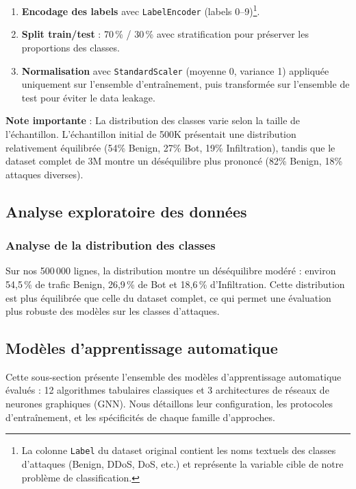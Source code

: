 ﻿\documentclass[11pt,a4paper]{article}
\begin{document}
\begin{enumerate}
    \item \textbf{Encodage des labels} avec \texttt{LabelEncoder} (labels 0--9)\footnote{La colonne \texttt{Label} du dataset original contient les noms textuels des classes d'attaques (Benign, DDoS, DoS, etc.) et représente la variable cible de notre problème de classification.}.
    
    \item \textbf{Split train/test} : 70\,\% / 30\,\% avec stratification pour préserver les proportions des classes.
    
    \item \textbf{Normalisation} avec \texttt{StandardScaler} (moyenne 0, variance 1) appliquée uniquement sur l'ensemble d'entraînement, puis transformée sur l'ensemble de test pour éviter le data leakage.
\end{enumerate}

\textbf{Note importante} : La distribution des classes varie selon la taille de l'échantillon. L'échantillon initial de 500K présentait une distribution relativement équilibrée (54\% Benign, 27\% Bot, 19\% Infiltration), tandis que le dataset complet de 3M montre un déséquilibre plus prononcé (82\% Benign, 18\% attaques diverses).

\subsection{Analyse exploratoire des données}

\subsubsection{Analyse de la distribution des classes}

Sur nos 500\,000 lignes, la distribution montre un déséquilibre modéré : environ 54,5\,\% de trafic Benign, 26,9\,\% de Bot et 18,6\,\% d'Infiltration. Cette distribution est plus équilibrée que celle du dataset complet, ce qui permet une évaluation plus robuste des modèles sur les classes d'attaques.

\subsection{Modèles d'apprentissage automatique}

Cette sous-section présente l'ensemble des modèles d'apprentissage automatique évalués : 12 algorithmes tabulaires classiques et 3 architectures de réseaux de neurones graphiques (GNN). Nous détaillons leur configuration, les protocoles d'entraînement, et les spécificités de chaque famille d'approches.
\end{document}
